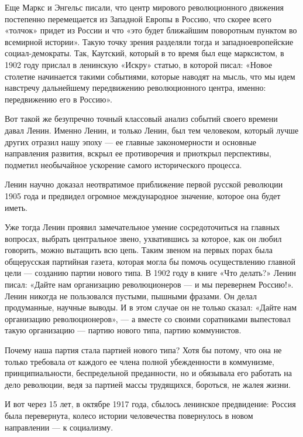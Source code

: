 \documentclass[12pt, a4paper, openany]{book}
\begin{document}
Еще Маркс и Энгельс писали, что центр мирового революционного движения постепенно перемещается из Западной Европы в Россию, что скорее всего «толчок» придет из России и что «это будет ближайшим поворотным пунктом во всемирной истории». Такую точку зрения разделяли тогда и западноевропейские социал-демократы. Так, Каутский, который в то время был еще марксистом, в 1902 году прислал в ленинскую «Искру» статью, в которой писал: «Новое столетие начинается такими событиями, которые наводят на мысль, что мы идем навстречу дальнейшему передвижению революционного центра, именно: передвижению его в Россию».

Вот такой же безупречно точный классовый анализ событий своего времени давал Ленин. Именно Ленин, и только Ленин, был тем человеком, который лучше других отразил нашу эпоху — ее главные закономерности и основные направления развития, вскрыл ее противоречия и приоткрыл перспективы, подметил необычайное ускорение самого исторического процесса.

Ленин научно доказал неотвратимое приближение первой русской революции 1905 года и предвидел огромное международное значение, которое она будет иметь.

Уже тогда Ленин проявил замечательное умение сосредоточиться на главных вопросах, выбрать центральное звено, ухватившись за которое, как он любил говорить, можно вытащить всю цепь. Таким звеном на первых порах была общерусская партийная газета, которая могла бы помочь осуществлению главной цели — созданию партии нового типа. В 1902 году в книге «Что делать?» Ленин писал: «Дайте нам организацию революционеров — и мы перевернем Россию!». Ленин никогда не пользовался пустыми, пышными фразами. Он делал продуманные, научные выводы. И в этом случае он не только сказал: «Дайте нам организацию революционеров», — а вместе со своими соратниками выпестовал такую организацию — партию нового типа, партию коммунистов.

Почему наша партия стала партией нового типа? Хотя бы потому, что она не только требовала от каждого ее члена полной убежденности в коммунизме, принципиальности, беспредельной преданности, но и обязывала его работать на дело революции, ведя за партией массы трудящихся, бороться, не жалея жизни.

И вот через 15 лет, в октябре 1917 года, сбылось ленинское предвидение: Россия была перевернута, колесо истории человечества повернулось в новом направлении — к социализму.
\end{document}
